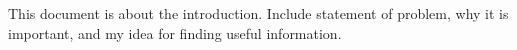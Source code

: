 \documentclass[../main.txt]{subfiles}
\begin{document}
This document is about the introduction. Include statement of problem, why
it is important, and my idea for finding useful information.











\biblo
\end{document}
